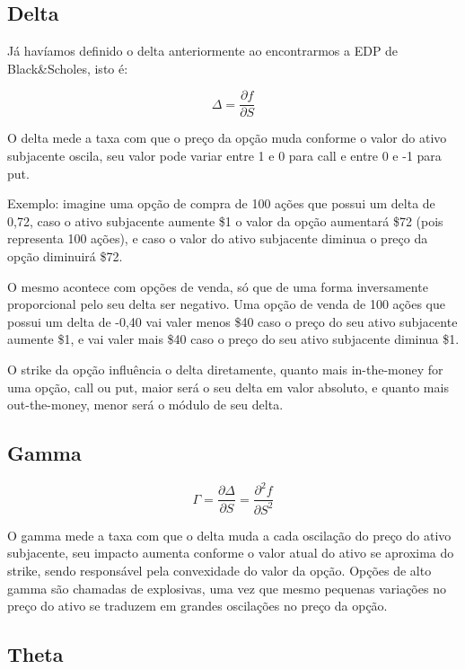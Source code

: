 \documentclass[]{book}
\theoremstyle{definition}
\theoremstyle{definition}
\theoremstyle{definition}
\theoremstyle{remark}
\begin{document}
\subsection{Delta}\label{delta}

Já havíamos definido o delta anteriormente ao encontrarmos a EDP de
Black\&Scholes, isto é:

\begin{equation}
\Delta = \frac{\partial f}{\partial S}
\label{eq:delta}
\end{equation}

O delta mede a taxa com que o preço da opção muda conforme o valor do
ativo subjacente oscila, seu valor pode variar entre 1 e 0 para call e
entre 0 e -1 para put.

Exemplo: imagine uma opção de compra de 100 ações que possui um delta de
0,72, caso o ativo subjacente aumente {\$}1 o valor da opção aumentará
{\$}72 (pois representa 100 ações), e caso o valor do ativo subjacente
diminua o preço da opção diminuirá {\$}72.

O mesmo acontece com opções de venda, só que de uma forma inversamente
proporcional pelo seu delta ser negativo. Uma opção de venda de 100
ações que possui um delta de -0,40 vai valer menos {\$}40 caso o preço
do seu ativo subjacente aumente {\$}1, e vai valer mais {\$}40 caso o
preço do seu ativo subjacente diminua {\$}1.

O strike da opção influência o delta diretamente, quanto mais
in-the-money for uma opção, call ou put, maior será o seu delta em valor
absoluto, e quanto mais out-the-money, menor será o módulo de seu delta.

\subsection{Gamma}\label{gamma}

\begin{equation}
\Gamma = \frac{\partial \Delta}{\partial S} = \frac{\partial^2 f}{\partial S^2}
\label{eq:gamma}
\end{equation}

O gamma mede a taxa com que o delta muda a cada oscilação do preço do
ativo subjacente, seu impacto aumenta conforme o valor atual do ativo se
aproxima do strike, sendo responsável pela convexidade do valor da
opção. Opções de alto gamma são chamadas de explosivas, uma vez que
mesmo pequenas variações no preço do ativo se traduzem em grandes
oscilações no preço da opção.

\subsection{Theta}\label{theta}
\end{document}
